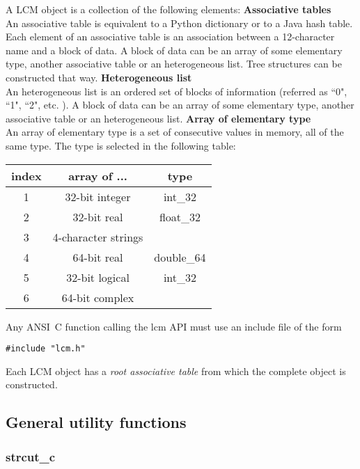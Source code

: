 A LCM object is a collection of the following elements:
\vskip 0.08cm
{\bf Associative tables}  \\
An associative table is equivalent to a Python dictionary or to a Java hash table. Each element of an associative table is an association between a 12-character name and a block of data. A block of data can be an array of some elementary type, another associative table or an heterogeneous list. Tree structures can be constructed that way.
\vskip 0.08cm
{\bf Heterogeneous list}  \\
An heterogeneous list is an ordered set of blocks of information (referred as ``0", ``1", ``2", etc. ). A block of data can be an array of some elementary type, another associative table or an heterogeneous list.
\vskip 0.08cm
{\bf Array of elementary type}  \\
An array of elementary type is a set of consecutive values in memory, all of the same type. The type is selected in the following table: \\
\begin{tabular}{|c|c|c|}
\hline
index & array of ... & type\\
\hline
1 & 32-bit integer & int\_32 \\
2 & 32-bit real & float\_32 \\
3 & 4-character strings &  \\
4 & 64-bit real & double\_64 \\
5 & 32-bit logical & int\_32 \\
6 & 64-bit complex&   \\
\hline
\end{tabular}

\vskip 0.08cm

Any ANSI~C function calling the {\sc lcm} API must use an include file of the form
\begin{verbatim}
#include "lcm.h"
\end{verbatim}

Each LCM object has a {\sl root associative table} from which the complete object is constructed.

\clearpage

\subsection{General utility functions}

\subsubsection{strcut\_c}

